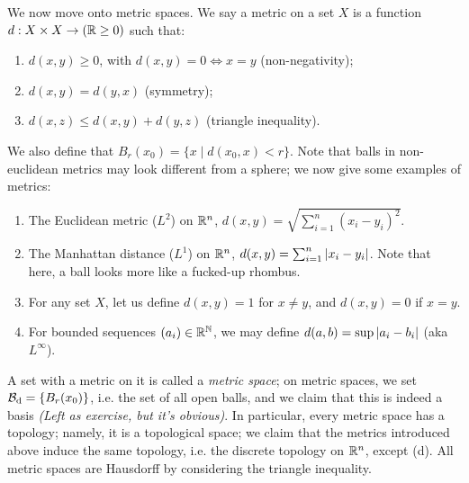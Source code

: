 \noindent We now move onto metric spaces. We say a metric on a set $X$ is a function $d : X \times X \to (\mathbb R \geq 0)$ such that:
\begin{enumerate}[label=(\alph*)]
    \item $d(x, y) \geq 0$, with $d(x, y) = 0 \iff x = y$ (non-negativity);
    \item $d(x, y) = d(y, x)$ (symmetry);
    \item $d(x, z) \leq d(x, y) + d(y, z)$ (triangle inequality).
\end{enumerate}
\noindent We also define that $B_r(x_0) = \{x \mid d(x_0, x) < r\}$. Note that balls in non-euclidean metrics may look different from a sphere; we now give some examples of metrics:
\begin{enumerate}[label=(\alph*)]
    \item The Euclidean metric ($L^2$) on $\mathbb R^n$, $d(x, y) = \sqrt{\sum_{i=1}^n (x_i - y_i)^2}$.
    \item The Manhattan distance ($L^1$) on $\mathbb R^n$, $d(x, y) = \sum_{i=1}^n \left\lvert x_i - y_i \right\rvert$. Note that here, a ball looks more like a fucked-up rhombus.
    \item For any set $X$, let us define $d(x, y) = 1$ for $x \neq y$, and $d(x, y) = 0$ if $x = y$.
    \item For bounded sequences $(a_i) \in \mathbb R^\mathbb N$, we may define $d(a, b) = \sup \left\lvert a_i - b_i \right\rvert$ (aka $L^\infty$).
\end{enumerate}
A set with a metric on it is called a \textit{metric space}; on metric spaces, we set $\mathcal B_\mathrm{d} = \{B_r(x_0)\}$, i.e. the set of all open balls, and we claim that this is indeed a basis \textit{(Left as exercise, but it's obvious)}. In particular, every metric space has a topology; namely, it is a topological space; we claim that the metrics introduced above induce the same topology, i.e. the discrete topology on $\mathbb R^n$, except (d).
\medskip\newline
\noindent All metric spaces are Hausdorff by considering the triangle inequality.
